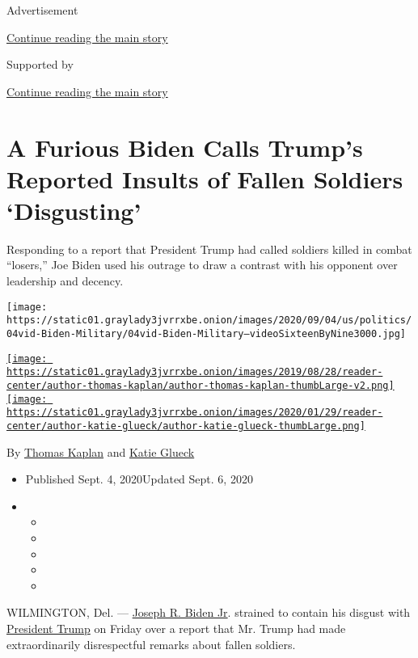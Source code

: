 Advertisement

\protect\hyperlink{after-top}{Continue reading the main story}

Supported by

\protect\hyperlink{after-sponsor}{Continue reading the main story}

\hypertarget{a-furious-biden-calls-trumps-reported-insults-of-fallen-soldiers-disgusting}{%
\section{A Furious Biden Calls Trump's Reported Insults of Fallen
Soldiers
`Disgusting'}\label{a-furious-biden-calls-trumps-reported-insults-of-fallen-soldiers-disgusting}}

Responding to a report that President Trump had called soldiers killed
in combat ``losers,'' Joe Biden used his outrage to draw a contrast with
his opponent over leadership and decency.

\texttt{[image: https://static01.graylady3jvrrxbe.onion/images/2020/09/04/us/politics/04vid-Biden-Military/04vid-Biden-Military--videoSixteenByNine3000.jpg]}

\href{https://www.nytimes3xbfgragh.onion/by/thomas-kaplan}{\texttt{[image: https://static01.graylady3jvrrxbe.onion/images/2019/08/28/reader-center/author-thomas-kaplan/author-thomas-kaplan-thumbLarge-v2.png]}}\href{https://www.nytimes3xbfgragh.onion/by/katie-glueck}{\texttt{[image: https://static01.graylady3jvrrxbe.onion/images/2020/01/29/reader-center/author-katie-glueck/author-katie-glueck-thumbLarge.png]}}

By \href{https://www.nytimes3xbfgragh.onion/by/thomas-kaplan}{Thomas
Kaplan} and
\href{https://www.nytimes3xbfgragh.onion/by/katie-glueck}{Katie Glueck}

\begin{itemize}
\item
  Published Sept. 4, 2020Updated Sept. 6, 2020
\item
  \begin{itemize}
  \item
  \item
  \item
  \item
  \item
  \end{itemize}
\end{itemize}

WILMINGTON, Del. ---
\href{https://www.nytimes3xbfgragh.onion/2020/09/06/us/politics/trump-biden-2020.html}{Joseph
R. Biden Jr}. strained to contain his disgust with
\href{https://www.nytimes3xbfgragh.onion/2020/09/06/us/politics/trump-biden-2020.html}{President
Trump} on Friday over a report that Mr. Trump had made extraordinarily
disrespectful remarks about fallen soldiers.


